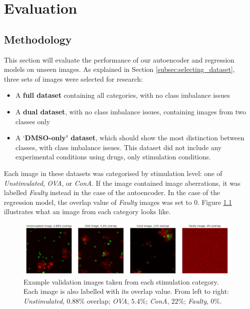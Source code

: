 \chapter{Evaluation} 

\section{Methodology}

This section will evaluate the performance of our autoencoder and regression models on unseen images. As explained in Section \ref{subsec:selecting_dataset}, three sets of images were selected for research:

\begin{itemize}
    \item A \textbf{full dataset} containing all categories, with no class imbalance issues
    \item A \textbf{dual dataset}, with no class imbalance issues, containing images from two classes only 
    \item A `\textbf{DMSO-only' dataset}, which should show the most distinction between classes, with class imbalance issues. This dataset did not include any experimental conditions using drugs, only stimulation conditions.
\end{itemize}

Each image in these datasets was categorised by stimulation level: one of \textit{Unstimulated}, \textit{OVA}, or \textit{ConA}. If the image contained image aberrations, it was labelled \textit{Faulty} instead in the case of the autoencoder. In the case of the regression model, the overlap value of \textit{Faulty} images was set to 0. Figure \ref{fig:explain_categories} illustrates what an image from each category looks like.

\begin{figure}[h]
    \centering
    \includegraphics[width=\textwidth]{dissertation/figures/category_images.png}
    \caption{Example validation images taken from each stimulation category. Each image is also labelled with its overlap value. From left to right: \textit{Unstimulated}, $0.88\%$ overlap; \textit{OVA}, $5.4\%$; \textit{ConA}, $22\%$; \textit{Faulty}, $0\%$.}
    \label{fig:explain_categories}
\end{figure}

